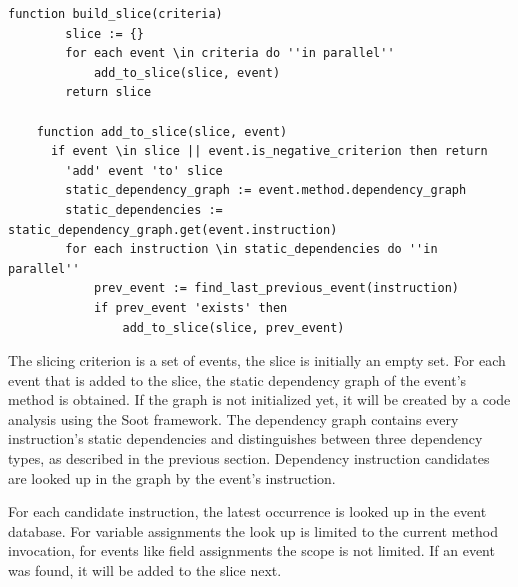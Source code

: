 ﻿\documentclass[
      english,
      ]{llncs}
\begin{document}
\begin{lstlisting}[numberfirstline=true,float,language=algorithm,firstnumber=1,label=lst:slicealgo,caption={Algorithm for building the slice}]
	function build_slice(criteria)
		slice := {}
		for each event \in criteria do ''in parallel''
			add_to_slice(slice, event)
		return slice
		
	function add_to_slice(slice, event)
	  if event \in slice || event.is_negative_criterion then return
		'add' event 'to' slice
		static_dependency_graph := event.method.dependency_graph
		static_dependencies := static_dependency_graph.get(event.instruction)
		for each instruction \in static_dependencies do ''in parallel''
			prev_event := find_last_previous_event(instruction)
			if prev_event 'exists' then
				add_to_slice(slice, prev_event)
\end{lstlisting}



The slicing criterion is a set of events, the slice is initially an empty set.
For each event that is added to the slice, the static dependency graph of the event's method is obtained.
If the graph is not initialized yet, it will be created by a code analysis using the Soot framework.
The dependency graph contains every instruction's static dependencies and distinguishes between three dependency types, as described in the previous section.
Dependency instruction candidates are looked up in the graph by the event's instruction.

For each candidate instruction, the latest occurrence is looked up in the event database.
For variable assignments the look up is limited to the current method invocation, for events like field assignments the scope is not limited.
If an event was found, it will be added to the slice next.
\end{document}
